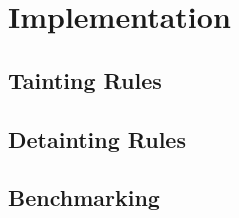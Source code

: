\chapter{Implementation}


\section{Tainting Rules}


\section{Detainting Rules}


\section{Benchmarking}


